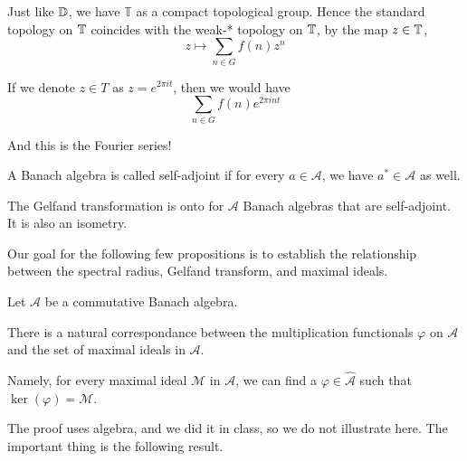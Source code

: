 Just like $\mathbb{D}$, we have $\mathbb{T}$ as a compact topological group. Hence the standard topology on $\mathbb{T}$ coincides with the weak-* topology on $\mathbb{T}$, by the map $z\in\mathbb{T}$,
\begin{equation*}
    z\mapsto \sum_{n\in G}f(n)z^n
\end{equation*}

If we denote $z\in T$ as $z=e^{2\pi it}$,
then we would have
\begin{equation*}
    \sum_{n\in G}f(n)e^{2\pi int}
\end{equation*}

And this is the Fourier series!


\begin{definition}
    A Banach algebra is called self-adjoint if for every $a\in\mathcal{A}$, we have $a^*\in\mathcal{A}$ as well.
\end{definition}

\begin{proposition}
    The Gelfand transformation is onto for $\mathcal{A}$ Banach algebras that are self-adjoint. It is also an isometry.
\end{proposition}

Our goal for the following few propositions is to establish the relationship between the spectral radius, Gelfand transform, and maximal ideals.

Let $\mathcal{A}$ be a commutative Banach algebra.
\begin{proposition}
    There is a natural correspondance between the multiplication functionals $\varphi$ on $\mathcal{A}$ and the set of maximal ideals in $\mathcal{A}$. 

    Namely, for every maximal ideal $\mathcal{M}$ in $\mathcal{A}$, we can find a $\varphi\in\widehat{\mathcal{A}}$ such that $\ker(\varphi)=\mathcal{M}$.
\end{proposition}
The proof uses algebra, and we did it in class, so we do not illustrate here. The important thing is the following result.

